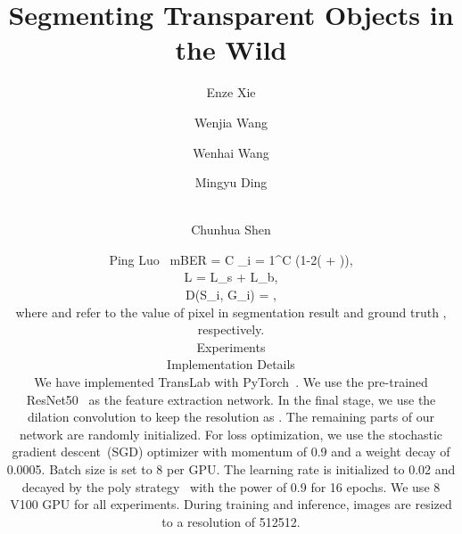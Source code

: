 \documentclass[runningheads]{llncs}
\begin{document}
\pagestyle{headings}
\mainmatter
\def\ECCVSubNumber{100}  

\title{Segmenting Transparent Objects in the Wild} 

\begin{comment}
\titlerunning{ECCV-20 submission ID \ECCVSubNumber}
\authorrunning{ECCV-20 submission ID \ECCVSubNumber}
\author{Anonymous ECCV submission}
\institute{Paper ID \ECCVSubNumber}
\end{comment}



\author{Enze Xie \and
    Wenjia Wang \and
    Wenhai Wang \and
    Mingyu Ding \and \\
    Chunhua Shen \and
    Ping Luo
\
	mBER = C \sum\nolimits_{i = 1}^{C} (1-2( + )),
	\label{eqn:r_i}
	
	L = L_s +  \lambda L_b,
	\label{eqn:loss-tot}
	
	D(S_i, G_i) = ,
	\label{eqn:dice-coef}
	
	where  and  refer to the value of pixel  in segmentation result  and ground truth , respectively.








    \section{Experiments}
    \subsection{Implementation Details}
    We have implemented TransLab with PyTorch~\cite{pytorch}. We use the pre-trained ResNet50~\cite{resnet} as the feature extraction network. In the final stage, we use the dilation convolution to keep the resolution as . The remaining parts of our network are randomly initialized. For loss optimization, we use the stochastic gradient descent~(SGD) optimizer with momentum of 0.9 and a weight decay of 0.0005. Batch size is set to 8 per GPU. The learning rate is initialized to 0.02 and decayed by the poly strategy~\cite{bisenet} with the power of 0.9 for 16 epochs. We use 8 V100 GPU for all experiments.
    During training and inference, images are resized to a resolution of 512512.


}
\end{document}
